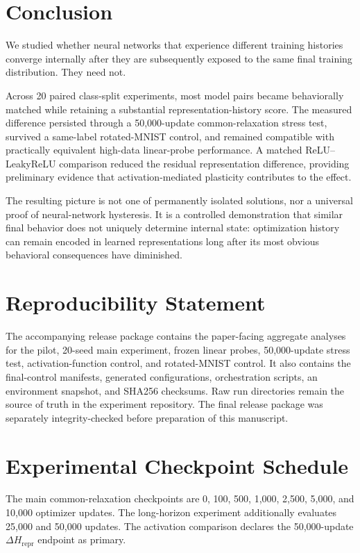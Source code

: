 \documentclass[11pt,a4paper]{article}
\newcommand{\hrepr}{H_{\mathrm{repr}}}
\begin{document}
\section{Conclusion}

We studied whether neural networks that experience different training histories converge internally after they are subsequently exposed to the same final training distribution. They need not.

Across 20 paired class-split experiments, most model pairs became behaviorally matched while retaining a substantial representation-history score. The measured difference persisted through a 50,000-update common-relaxation stress test, survived a same-label rotated-MNIST control, and remained compatible with practically equivalent high-data linear-probe performance. A matched ReLU--LeakyReLU comparison reduced the residual representation difference, providing preliminary evidence that activation-mediated plasticity contributes to the effect.

The resulting picture is not one of permanently isolated solutions, nor a universal proof of neural-network hysteresis. It is a controlled demonstration that similar final behavior does not uniquely determine internal state: optimization history can remain encoded in learned representations long after its most obvious behavioral consequences have diminished.

\section*{Reproducibility Statement}
The accompanying release package contains the paper-facing aggregate analyses for the pilot, 20-seed main experiment, frozen linear probes, 50,000-update stress test, activation-function control, and rotated-MNIST control. It also contains the final-control manifests, generated configurations, orchestration scripts, an environment snapshot, and SHA256 checksums. Raw run directories remain the source of truth in the experiment repository. The final release package was separately integrity-checked before preparation of this manuscript.

\appendix
\section{Experimental Checkpoint Schedule}
The main common-relaxation checkpoints are 0, 100, 500, 1,000, 2,500, 5,000, and 10,000 optimizer updates. The long-horizon experiment additionally evaluates 25,000 and 50,000 updates. The activation comparison declares the 50,000-update $\Delta\hrepr$ endpoint as primary.
\end{document}

